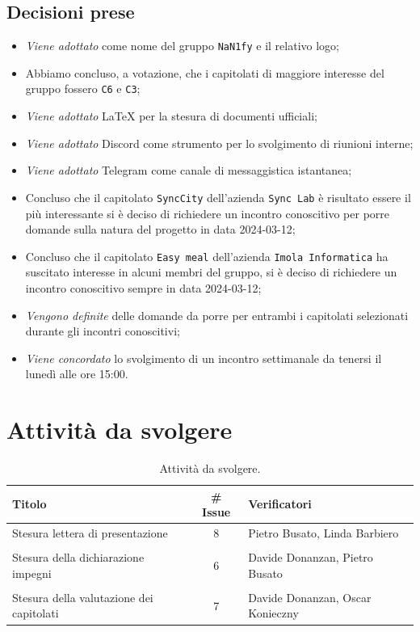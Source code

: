 \documentclass[8pt]{article}
\newcommand{\signatureline}[1]{%
	 \par\vspace{0.5cm}
	\noindent\makebox[\linewidth][r]{\rule{0.2\textwidth}{0.5pt}\hspace{3cm}\makebox[0pt][r]{\vspace{3pt}\footnotesize #1}}%
}
\begin{document}
\subsection{Decisioni prese}
\begin{itemize}
	\setlength\itemsep{0em}
	\item \textit{Viene adottato} come nome del gruppo \texttt{NaN1fy} e il relativo logo;
	\item Abbiamo concluso, a votazione, che i capitolati di maggiore interesse del gruppo fossero \texttt{C6} e \texttt{C3};
	\item \textit{Viene adottato} \LaTeX\: per la stesura di documenti ufficiali;
	\item \textit{Viene adottato} Discord come strumento per lo svolgimento di riunioni interne;
	\item \textit{Viene adottato} Telegram come canale di messaggistica istantanea;
	\item Concluso che il capitolato \texttt{SyncCity} dell’azienda \texttt{Sync Lab} è risultato essere il più interessante si è deciso di richiedere un incontro conoscitivo per porre domande sulla natura del progetto in data 2024-03-12;
	\item Concluso che il capitolato \texttt{Easy meal} dell’azienda \texttt{Imola Informatica} ha suscitato interesse in alcuni membri del gruppo, si è deciso di richiedere un incontro conoscitivo sempre in data 2024-03-12;
	\item \textit{Vengono definite} delle domande da porre per entrambi i capitolati selezionati durante gli incontri conoscitivi;
	\item \textit{Viene concordato} lo svolgimento di un incontro settimanale da tenersi il lunedì alle ore 15:00.
\end{itemize}
\section{Attività da svolgere}
\begin{table}[ht!]
	\centering
	\begin{tabular}{lcl}
		\toprule
		\textbf{Titolo} & \textbf{\# Issue} & \textbf{Verificatori} \\
		\midrule
		Stesura lettera di presentazione & 8 & Pietro Busato, Linda Barbiero\\\\
		Stesura della dichiarazione impegni  &  6 & Davide Donanzan, Pietro Busato \\\\
		Stesura della valutazione dei capitolati & 7 & Davide Donanzan, Oscar Konieczny \\
		\bottomrule
	\end{tabular}
	\caption{Attività da svolgere.}
	\label{table:Attivita da svolgere}
\end{table}
\end{document}
